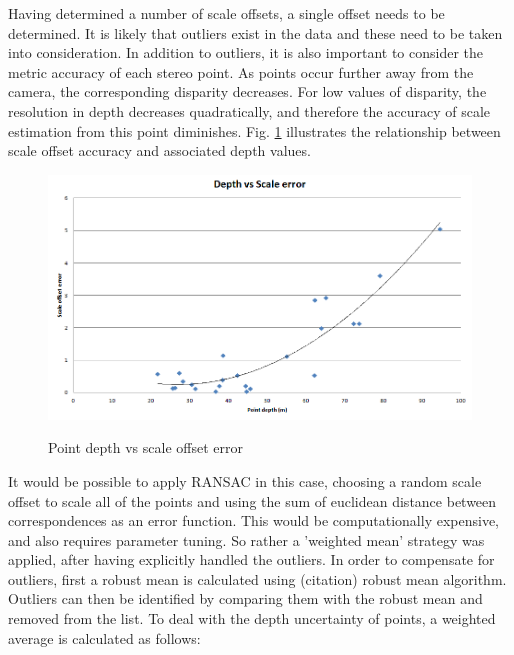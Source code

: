 Having determined a number of scale offsets, a single offset needs to be determined.  It is likely that outliers exist in the data and these need to be taken into consideration.  In addition to outliers, it is also important to consider the metric accuracy of each stereo point.  As points occur further away from the camera, the corresponding disparity decreases.  For low values of disparity, the resolution in depth decreases quadratically, and therefore the accuracy of scale estimation from this point diminishes. Fig. \ref{fig:scale_bar_graph} illustrates the relationship between scale offset accuracy and associated depth values.
\begin{figure}[h]
  \centering
    \includegraphics[width=1.0\textwidth]{chapters/images/distance_vs_scale_error}\\
  \caption{Point depth vs scale offset error}
  \label{fig:scale_bar_graph}
\end{figure}


It would be possible to apply RANSAC in this case, choosing a random scale offset to scale all of the points and using the sum of euclidean distance between correspondences as an error function.  This would be computationally expensive, and also requires parameter tuning.  So rather a 'weighted mean' strategy was applied, after having explicitly handled the outliers.
In order to compensate for outliers, first a robust mean is calculated using (citation) robust mean algorithm.  Outliers can then be identified by comparing them with the robust mean and removed from the list. To deal with the depth uncertainty of points, a weighted average is calculated as follows:

